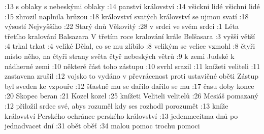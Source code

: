 :13 {s oblaky} {} {} {s nebeskými oblaky} {} {}
:14 {panství} {} {} {království} {} {}
:14 {všickni lidé} {} {} {všichni lidé} {} {}
:15 {zhrozil} {} {} {naplnila hrůzou} {} {}
:18 {království svatých} {} {} {království se ujmou svatí} {} {}
:18 {výsostí} {} {} {Nejvyššího} {} {}
:22 {Starý dnů} {} {} {Věkovitý} {} {}
:28 {v srdci} {} {} {ve svém srdci} {} {}
:1  {Léta třetího kralování Balsazara} {} {} {V třetím roce kralování krále Belšasara} {} {}
:3  {vyšší} {} {} {větší} {} {}
:4  {trkal} {} {} {trkat} {} {}
:4  {veliké} {} {} {Dělal, co se mu zlíbilo} {} {}
:8  {velikým} {} {} {se velice vzmohl} {} {}
:8  {čtyři místo něho, na čtyři strany světa} {} {} {čtyř nebeských větrů} {} {}
:9  {k zemi Judské} {} {} {k nádherné zemi} {} {}
:10 {některé} {} {} {část toho zástupu} {} {}
:10 {svrhl} {} {} {srazil} {} {}
:11 {knížeti} {} {} {veliteli} {} {}
:11 {zastavena} {} {} {zrušil} {} {}
:12 {vojsko to vydáno v převrácenost proti ustavičné oběti} {} {} {Zástup byl sveden ke vzpouře} {} {}
:12 {šťastně mu se dařilo} {} {} {dařilo se mu} {} {}
:17 {času} {} {} {doby konce} {} {}
:20 {Skopec} {} {} {beran} {} {}
:21 {Kozel} {} {} {kozel} {} {}
:25 {knížeti} {} {} {Veliteli velitelů} {} {}
:26 {Mesiáš} {} {} {pomazaný} {} {}
:12 {přiložil srdce své, abys rozuměl} {} {} {kdy ses rozhodl porozumět} {} {}
:13 {kníže království Perského} {} {} {ochránce perského království} {} {}
:13 {jedenmecítma dnů} {} {} {po jednadvacet dní} {} {}
:31 {obět} {} {} {oběť} {} {}
:34 {malou pomoc} {} {} {trochu pomoci} {} {}


\endinput
\vdef   {}  %
        {}  %
        {}  %
        {}  %
        {}  %
        {}  %
        
